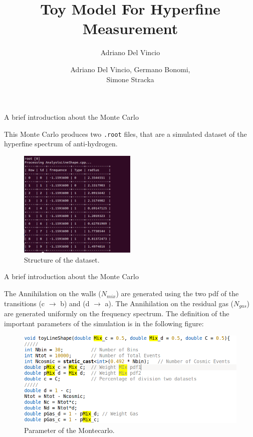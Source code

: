 \documentclass[9pt]{beamer}
\author{Adriano Del Vincio}
\title[Alpha 2]{Toy Model For Hyperfine Measurement}
\author[Adriano, Germano, Simone]{Adriano Del Vincio, Germano Bonomi,\\ Simone Stracka}
\institute[]{University of Brescia, INFN Pisa}
\begin{document}
\begin{frame}
\titlepage
\end{frame}



\begin{frame}{A brief introduction about the Monte Carlo}

This Monte Carlo produces two \texttt{.root} files, that are a simulated dataset of the hyperfine spectrum of anti-hydrogen.
\begin{figure}[hbtp]
 \centering
 \includegraphics[width = 0.5\textwidth]{StructureDataTree.png}
 \caption{ Structure of the dataset.}
 \end{figure}

\end{frame}

\begin{frame}{A brief introduction about the Monte Carlo}

The Annihilation on the walls ($N_{mix}$) are generated using the two pdf of the transitions (c $\rightarrow$ b) and (d $\rightarrow$ a). The Annihilation on the residual gas ($N_{gas}$) are generated uniformly on the frequency spectrum. The definition of the important parameters of the simulation is in the following figure:

\begin{figure}[hbtp]
\centering
\includegraphics[width = \textwidth]{MontecarloParams.png}
\caption{ Parameter of the Montecarlo.}
\end{figure}


\end{frame}
\end{document}
